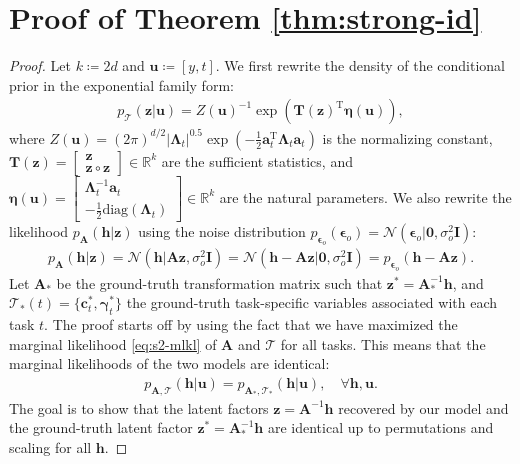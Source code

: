 \documentclass{article} %
\theoremstyle{plain}
\theoremstyle{definition}
\theoremstyle{remark}
\begin{document}
\section{Proof of Theorem \ref{thm:strong-id}}\label{appendix:proof-causal-id}
\begin{proof}
    Let $k\coloneqq2d$ and $\mathbf{u}\coloneqq[y,t]$. We first rewrite the density of the conditional prior in the exponential family form:
    \begin{align}
        p_{\mathcal{T}}(\mathbf{z}|\mathbf{u}) = Z(\mathbf{u})^{-1}\exp\left(\mathbf{T}(\mathbf{z})^{\text{T}}\boldsymbol{\eta}(\mathbf{u})\right),
    \end{align}
    where $Z(\mathbf{u})=(2\pi)^{d/2}|\boldsymbol{\Lambda}_t|^{0.5}\exp\left(-\frac{1}{2}\mathbf{a}_t^{\text{T}}\boldsymbol{\Lambda}_t\mathbf{a}_t\right)$ is the normalizing constant, $\mathbf{T}(\mathbf{z})=\left[\begin{smallmatrix}\mathbf{z} \\ \mathbf{z}\circ\mathbf{z}\end{smallmatrix}\right]\in\mathbb{R}^{k}$ are the sufficient statistics, and $\boldsymbol{\eta}(\mathbf{u})=\left[\begin{smallmatrix}\boldsymbol{\Lambda}_t^{-1}\mathbf{a}_t \\ -\frac{1}{2}\text{diag}(\boldsymbol{\Lambda}_t)\end{smallmatrix}\right]\in\mathbb{R}^{k}$ are the natural parameters. We also rewrite the likelihood $p_{\mathbf{A}}(\mathbf{h}|\mathbf{z})$ using the noise distribution $p_{\boldsymbol{\epsilon}_o}(\boldsymbol{\epsilon}_o)=\mathcal{N}(\boldsymbol{\epsilon}_o|\mathbf{0},\sigma_o^2\mathbf{I})$:
    \begin{align}
        p_{\mathbf{A}}(\mathbf{h}|\mathbf{z}) =\mathcal{N}(\mathbf{h}|\mathbf{A}\mathbf{z},\sigma_{o}^{2}\mathbf{I})=\mathcal{N}(\mathbf{h}-\mathbf{A}\mathbf{z}|\mathbf{0},\sigma_o^2\mathbf{I})=p_{\boldsymbol{\epsilon}_o}(\mathbf{h}-\mathbf{A}\mathbf{z}).
    \end{align}
    Let $\mathbf{A}_{*}$ be the ground-truth transformation matrix such that $\mathbf{z}^*=\mathbf{A}_{*}^{-1}\mathbf{h}$, and $\mathcal{T}_{*}(t)=\{\mathbf{c}_t^*,\boldsymbol{\gamma}_t^*\}$ the ground-truth task-specific variables associated with each task $t$. The proof starts off by using the fact that we have maximized the marginal likelihood \eqref{eq:s2-mlkl} of $\mathbf{A}$ and $\mathcal{T}$ for all tasks. This means that the marginal likelihoods of the two models are identical:
    \begin{align}\label{eq:equal-mlkl}
        p_{\mathbf{A},\mathcal{T}}(\mathbf{h}|\mathbf{u})=p_{\mathbf{A}_{*},\mathcal{T}_{*}}(\mathbf{h}|\mathbf{u}),\quad\forall\mathbf{h},\mathbf{u}.
    \end{align}
    The goal is to show that the latent factors $\mathbf{z}=\mathbf{A}^{-1}\mathbf{h}$ recovered by our model and the ground-truth latent factor $\mathbf{z}^*=\mathbf{A}_{*}^{-1}\mathbf{h}$ are identical up to permutations and scaling for all $\mathbf{h}$. 
    

\end{proof}
\end{document}
